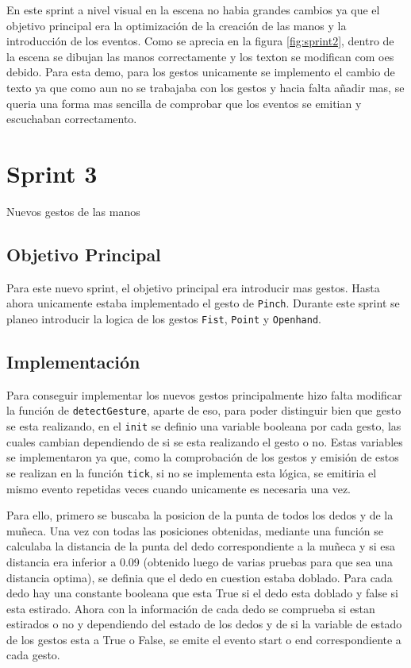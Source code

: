 \documentclass[a4paper, 12pt]{book}
\begin{document}
En este sprint a nivel visual en la escena no habia grandes cambios ya que el objetivo principal era la optimización de la creación de las manos y la introducción de los eventos. 
Como se aprecia en la figura \ref{fig:sprint2}, dentro de la escena se dibujan las manos correctamente y los texton se modifican com oes debido. Para esta demo, para los gestos unicamente se implemento el cambio de texto ya que 
como aun no se trabajaba con los gestos y hacia falta añadir mas, se queria una forma mas sencilla de comprobar que los eventos se emitian y escuchaban correctamento. 

\section{Sprint 3}
\label{sec:sprint3}
Nuevos gestos de las manos

\subsection{Objetivo Principal}
\label{subsec:objetivo-principal3}
Para este nuevo sprint, el objetivo principal era introducir mas gestos. Hasta ahora unicamente estaba implementado el gesto de \texttt{Pinch}.
Durante este sprint se planeo introducir la logica de los gestos \texttt{Fist}, \texttt{Point} y \texttt{Openhand}.

\subsection{Implementación}
\label{subsec:implementacion3}
Para conseguir implementar los nuevos gestos principalmente hizo falta modificar la función de \texttt{detectGesture}, aparte de eso, para poder distinguir bien que gesto se esta realizando, en el \texttt{init} se definio una variable booleana por cada gesto, las cuales cambian dependiendo de si se esta realizando el gesto o no. Estas variables se implementaron ya que, como la comprobación de los gestos y emisión de estos se realizan en la función \texttt{tick}, si no se implementa esta lógica, se emitiria el mismo evento repetidas veces cuando unicamente es necesaria una vez.

Para ello, primero se buscaba la posicion de la punta de todos los dedos y de la muñeca. Una vez con todas las posiciones obtenidas, mediante una función se calculaba la distancia de la punta del dedo correspondiente a la muñeca y si esa distancia era inferior a 0.09 (obtenido luego de varias pruebas para que sea una distancia optima), se definia que el dedo en cuestion estaba doblado.
Para cada dedo hay una constante booleana que esta True si el dedo esta doblado y false si esta estirado. Ahora con la información de cada dedo se comprueba si estan estirados o no y dependiendo del estado de los dedos y de si la variable de estado de los gestos esta a True o False, se emite el evento start o end correspondiente a cada gesto. 
\end{document}
